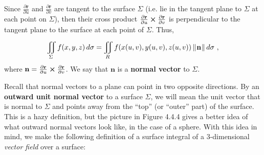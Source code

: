 Since $\frac{\partial \mathbf{r}}{\partial u}$ and $\frac{\partial \mathbf{r}}{\partial v}$ are tangent to the surface
$\Sigma$ (i.e. lie in the tangent plane to $\Sigma$ at each point on $\Sigma$), then their cross product
$\frac{\partial \mathbf{r}}{\partial u} \bm{\times} \frac{\partial \mathbf{r}}{\partial v}$ is perpendicular to the
tangent plane to the surface at each point of $\Sigma$. Thus,

\begin{displaymath}
 \iint\limits_{\Sigma} f(x,y,z)\,d\sigma = \iint\limits_{R} f(x(u,v),y(u,v),z(u,v))\,\lVert\mspace{1mu}\mathbf{n}\mspace{1mu}\rVert\,d\sigma ~,
\end{displaymath}
where $\mathbf{n} = \frac{\partial \mathbf{r}}{\partial u} \bm{\times} \frac{\partial \mathbf{r}}{\partial v}$.
We say that $\mathbf{n}$ is a \textbf{normal vector} to $\Sigma$.

\piccaption[]{}
Recall that normal vectors to a plane can point in two opposite directions. By an
\textbf{outward unit normal vector} to a surface $\Sigma$, we will mean the unit vector that is normal to $\Sigma$ and
points away from the ``top'' (or ``outer'' part) of the surface. This is a hazy definition, but the picture in
Figure 4.4.4 gives a better idea of what outward normal vectors look like, in the case of a sphere.
With this idea in mind, we make the following definition of a surface integral of a 3-dimensional
\emph{vector field} over a surface:

